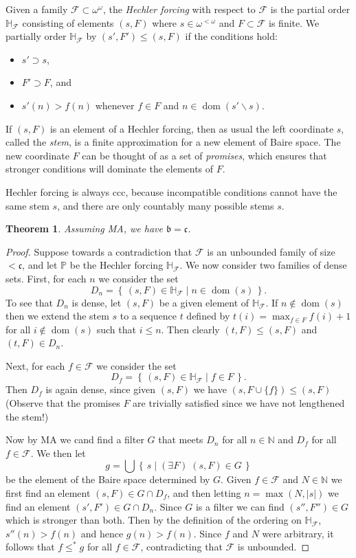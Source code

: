 \documentclass[11pt,oneside]{amsbook}
\newcommand{\set}[1]{\left\{\,#1\,\right\}}
\newcommand{\N}{\mathbb N}
\newcommand{\PP}{\mathbb P}
\DeclareMathOperator{\dom}{dom}
\theoremstyle{definition}
\theoremstyle{plain}
\newtheorem{theorem}{Theorem}[section]
\theoremstyle{definition}
\theoremstyle{remark}
\numberwithin{equation}{section}
\numberwithin{figure}{section}
\begin{document}
Given a family $\mathcal F\subset\omega^\omega$, the \emph{Hechler forcing} with respect to $\mathcal F$ is the partial order $\mathbb H_{\mathcal F}$ consisting of elements $(s,F)$ where $s\in\omega^{<\omega}$ and $F\subset\mathcal F$ is finite. We partially order $\mathbb H_{\mathcal F}$ by $(s',F')\leq(s,F)$ if the conditions hold:
\begin{itemize}
\item $s'\supset s$,
\item $F'\supset F$, and
\item $s'(n)>f(n)$ whenever $f\in F$ and $n\in\dom(s'\smallsetminus s)$.
\end{itemize}
If $(s,F)$ is an element of a Hechler forcing, then as usual the left coordinate $s$, called the \emph{stem}, is a finite approximation for a new element of Baire space. The new coordinate $F$ can be thought of as a set of \emph{promises}, which ensures that stronger conditions will dominate the elements of $F$.

Hechler forcing is always ccc, because incompatible conditions cannot have the same stem $s$, and there are only countably many possible stems $s$.

\begin{theorem}
  Assuming MA, we have $\mathfrak b=\mathfrak c$.
\end{theorem}

\begin{proof}
  Suppose towards a contradiction that $\mathcal F$ is an unbounded family of size $<\mathfrak c$, and let $\PP$ be the Hechler forcing $\mathbb H_{\mathcal F}$. We now consider two families of dense sets. First, for each $n$ we consider the set
  \[D_n=\set{(s,F)\in\mathbb H_{\mathcal F}\mid n\in\dom(s)}\text{.}
  \]
  To see that $D_n$ is dense, let $(s,F)$ be a given element of $\mathbb H_{\mathcal F}$. If $n\notin\dom(s)$ then we extend the stem $s$ to a sequence $t$ defined by $t(i)=\max_{f\in F}f(i)+1$ for all $i\notin\dom(s)$ such that $i\leq n$. Then clearly $(t,F)\leq(s,F)$ and $(t,F)\in D_n$.

  Next, for each $f\in\mathcal F$ we consider the set
  \[D_f=\set{(s,F)\in\mathbb H_{\mathcal F}\mid f\in F}\text{.}
  \]
  Then $D_f$ is again dense, since given $(s,F)$ we have $(s,F\cup\{f\})\leq(s,F)$ (Observe that the promises $F$ are trivially satisfied since we have not lengthened the stem!)

  Now by MA we cand find a filter $G$ that meets $D_n$ for all $n\in\N$ and  $D_f$ for all $f\in\mathcal F$. We then let
  \[g=\bigcup\set{s\mid(\exists F)\;(s,F)\in G}
  \]
  be the element of the Baire space determined by $G$. Given $f\in\mathcal F$ and $N\in\N$ we first find an element $(s,F)\in G\cap D_f$, and then letting $n=\max(N,|s|)$ we find an element $(s',F')\in G\cap D_n$. Since $G$ is a filter we can find $(s'',F'')\in G$ which is stronger than both. Then by the definition of the ordering on $\mathbb H_{\mathcal F}$, $s''(n)>f(n)$ and hence $g(n)>f(n)$. Since $f$ and $N$ were arbitrary, it follows that $f\leq^*g$ for all $f\in\mathcal F$, contradicting that $\mathcal F$ is unbounded.
\end{proof}
\end{document}
